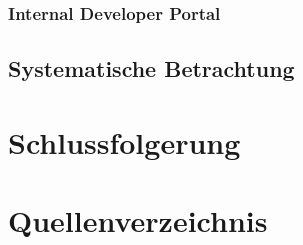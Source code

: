 \documentclass[a4paper,12pt]{article}
\begin{document}
    \subsubsection{Internal Developer Portal}

    \subsection{Systematische Betrachtung}


    \section{Schlussfolgerung}
    \pagebreak

    \section{Quellenverzeichnis}

    \printbibliography[heading=none]
\end{document}

